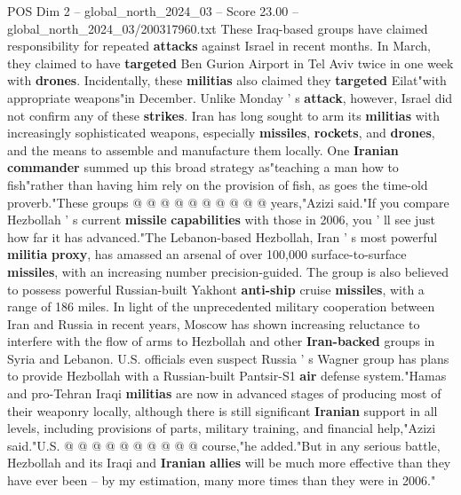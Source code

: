 \begin{textsample}{POS Dim 2 – global\_north\_2024\_03 – Score 23.00 – global\_north\_2024\_03/200317960.txt}
These Iraq-based groups have claimed responsibility for repeated \textbf{attacks} against Israel in recent months.
In March, they claimed to have \textbf{targeted} Ben Gurion Airport in Tel Aviv twice in one week with \textbf{drones}.
Incidentally, these \textbf{militias} also claimed they \textbf{targeted} Eilat"with appropriate weapons"in December.
Unlike Monday ' s \textbf{attack}, however, Israel did not confirm any of these \textbf{strikes}.
Iran has long sought to arm its \textbf{militias} with increasingly sophisticated weapons, especially \textbf{missiles}, \textbf{rockets}, and \textbf{drones}, and the means to assemble and manufacture them locally.
One \textbf{Iranian} \textbf{commander} summed up this broad strategy as"teaching a man how to fish"rather than having him rely on the provision of fish, as goes the time-old proverb."These groups @ @ @ @ @ @ @ @ @ @ years,"Azizi said."If you compare Hezbollah ' s current \textbf{missile} \textbf{capabilities} with those in 2006, you ' ll see just how far it has advanced."The Lebanon-based Hezbollah, Iran ' s most powerful \textbf{militia} \textbf{proxy}, has amassed an arsenal of over 100,000 surface-to-surface \textbf{missiles}, with an increasing number precision-guided.
The group is also believed to possess powerful Russian-built Yakhont \textbf{anti-ship} cruise \textbf{missiles}, with a range of 186 miles.
In light of the unprecedented military cooperation between Iran and Russia in recent years, Moscow has shown increasing reluctance to interfere with the flow of arms to Hezbollah and other \textbf{Iran-backed} groups in Syria and Lebanon.
U.S. officials even suspect Russia ' s Wagner group has plans to provide Hezbollah with a Russian-built Pantsir-S1 \textbf{air} defense system."Hamas and pro-Tehran Iraqi \textbf{militias} are now in advanced stages of producing most of their weaponry locally, although there is still significant \textbf{Iranian} support in all levels, including provisions of parts, military training, and financial help,"Azizi said."U.S. @ @ @ @ @ @ @ @ @ @ course,"he added."But in any serious battle, Hezbollah and its Iraqi and \textbf{Iranian} \textbf{allies} will be much more effective than they have ever been -- by my estimation, many more times than they were in 2006."

\end{textsample}
